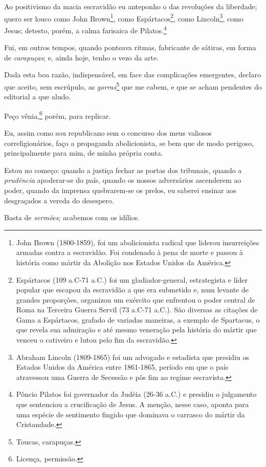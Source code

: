 {Ao positivismo da macia escravidão eu anteponho o das revoluções da
liberdade; quero ser louco como John Brown\footnote{John Brown
  (1800-1859), foi um abolicionista radical que liderou insurreições
  armadas contra a escravidão. Foi condenado à pena de morte e passou à
  história como mártir da Abolição nos Estados Unidos da América.}, como
Espártacos\footnote{Espártacos (109 a.C-71 a.C.) foi um
  gladiador-general, estrategista e líder popular que escapou da
  escravidão a que era submetido e, num levante de grandes proporções,
  organizou um exército que enfrentou o poder central de Roma na
  Terceira Guerra Servil (73 a.C-71 a.C.). São diversas as citações de
  Gama a Espártacos, grafado de variadas maneiras, a exemplo de
  Spartacus, o que revela sua admiração e até mesmo veneração pela
  história do mártir que venceu o cativeiro e lutou pelo fim da
  escravidão.}, como Lincoln\footnote{Abraham Lincoln (1809-1865) foi
  um advogado e estadista que presidiu os Estados Unidos da América
  entre 1861-1865, período em que o país atravessou uma Guerra de
  Secessão e pôs fim ao regime escravista.}, como Jesus; detesto, porém,
a calma farisaica de Pilatos.\footnote{Pôncio Pilatos foi governador
  da Judéia (26-36 a.C.) e presidiu o julgamento que sentenciou a
  crucificação de Jesus. A menção, nesse caso, aponta para uma espécie
  de sentimento fingido que dominava o carrasco do mártir da
  Cristandade.}

Fui, em outros tempos, quando ponteava ritmas, fabricante de sátiras, em
forma de \emph{carapuças}; e, ainda hoje, tenho o vezo da arte.

Dada esta boa razão, indispensável, em face das complicações emergentes,
declaro que aceito, sem escrúpulo, as \emph{gorras}\footnote{Toucas,
  carapuças.} que me cabem, e que se acham pendentes do editorial a que
aludo.

Peço vênia,\footnote{Licença, permissão.}
porém, para replicar.

Eu, assim como sou republicano sem o concurso dos meus valiosos
correligionários, faço a propaganda abolicionista, se bem que de modo
perigoso, principalmente para mim, de minha própria conta.

Estou no começo: quando a justiça fechar as portas dos tribunais, quando
a \emph{prudência} apoderar-se do país, quando os nossos adversários
ascenderem ao poder, quando da imprensa quebrarem-se os prelos, eu
saberei ensinar aos desgraçados a vereda do desespero.

Basta de \emph{sermões}; acabemos com os idílios.

}
